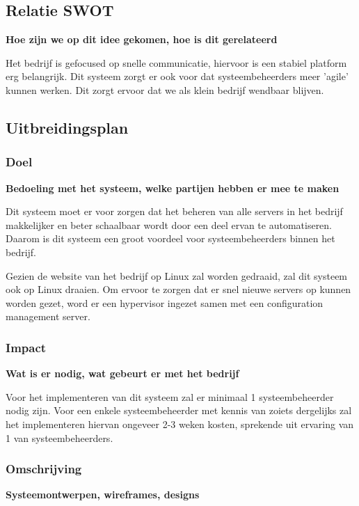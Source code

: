 \subsection{Relatie SWOT}
{\bf Hoe zijn we op dit idee gekomen, hoe is dit gerelateerd}

Het bedrijf is gefocused op snelle communicatie,
hiervoor is een stabiel platform erg belangrijk.
Dit systeem zorgt er ook voor dat systeembeheerders meer 'agile' kunnen werken.
Dit zorgt ervoor dat we als klein bedrijf wendbaar blijven.

\subsection{Uitbreidingsplan}

\subsubsection{Doel}
{\bf Bedoeling met het systeem, welke partijen hebben er mee te maken}

Dit systeem moet er voor zorgen dat het beheren van alle servers in het bedrijf
makkelijker en beter schaalbaar wordt door een deel ervan te automatiseren.
Daarom is dit systeem een groot voordeel voor systeembeheerders binnen het bedrijf.

Gezien de website van het bedrijf op Linux zal worden gedraaid,
zal dit systeem ook op Linux draaien.
Om ervoor te zorgen dat er snel nieuwe servers op kunnen worden gezet,
word er een hypervisor ingezet samen met een configuration management server.

\subsubsection{Impact}
{\bf Wat is er nodig, wat gebeurt er met het bedrijf}

Voor het implementeren van dit systeem zal er minimaal 1 systeembeheerder nodig zijn.
Voor een enkele systeembeheerder met kennis van zoiets dergelijks
zal het implementeren hiervan ongeveer 2-3 weken kosten, sprekende uit ervaring
van 1 van systeembeheerders.

\subsubsection{Omschrijving}
{\bf Systeemontwerpen, wireframes, designs}

